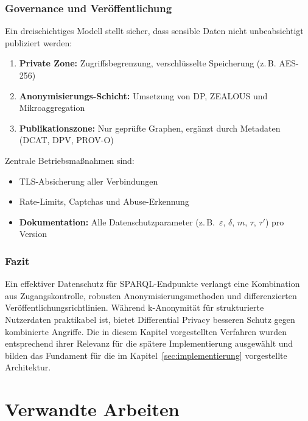 \subsection{Governance und Veröffentlichung}

Ein dreischichtiges Modell stellt sicher, dass sensible Daten nicht unbeabsichtigt publiziert werden:
\begin{enumerate}
\item \textbf{Private Zone:} Zugriffsbegrenzung, verschlüsselte Speicherung (z.\,B. AES-256)
\item \textbf{Anonymisierungs-Schicht:} Umsetzung von DP, ZEALOUS und Mikroaggregation
\item \textbf{Publikationszone:} Nur geprüfte Graphen, ergänzt durch Metadaten (DCAT, DPV, PROV-O)
\end{enumerate}

Zentrale Betriebsmaßnahmen sind:
\begin{itemize}
\item TLS-Absicherung aller Verbindungen
\item Rate-Limits, Captchas und Abuse-Erkennung
\item \textbf{Dokumentation:} Alle Datenschutzparameter (z.\,B.\ $\varepsilon$, $\delta$, $m$, $\tau$, $\tau'$) pro Version
\end{itemize}

\subsection{Fazit}

Ein effektiver Datenschutz für SPARQL-Endpunkte verlangt eine Kombination aus Zugangskontrolle, robusten Anonymisierungsmethoden und differenzierten Veröffentlichungsrichtlinien. Während k-Anonymität für strukturierte Nutzerdaten praktikabel ist, bietet Differential Privacy besseren Schutz gegen kombinierte Angriffe. Die in diesem Kapitel vorgestellten Verfahren wurden entsprechend ihrer Relevanz für die spätere Implementierung ausgewählt und bilden das Fundament für die im Kapitel~\ref{sec:implementierung} vorgestellte Architektur.
















\chapter{Verwandte Arbeiten}
\label{sec:related-work}

